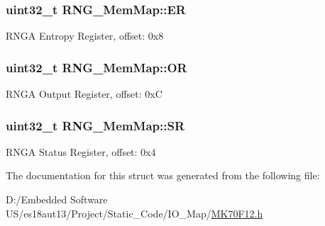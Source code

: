 \subsubsection[{E\+R}]{\setlength{\rightskip}{0pt plus 5cm}uint32\+\_\+t R\+N\+G\+\_\+\+Mem\+Map\+::\+E\+R}\label{struct_r_n_g___mem_map_a00c023d8dafb81ac55c86b3ad8decb3d}
R\+N\+G\+A Entropy Register, offset\+: 0x8 \hypertarget{struct_r_n_g___mem_map_a28a39f4167d28546cea918687d2951f1}{}
\subsubsection[{O\+R}]{\setlength{\rightskip}{0pt plus 5cm}uint32\+\_\+t R\+N\+G\+\_\+\+Mem\+Map\+::\+O\+R}\label{struct_r_n_g___mem_map_a28a39f4167d28546cea918687d2951f1}
R\+N\+G\+A Output Register, offset\+: 0x\+C \hypertarget{struct_r_n_g___mem_map_a5d258b2ed1915070a6d3651092d8f3c7}{}
\subsubsection[{S\+R}]{\setlength{\rightskip}{0pt plus 5cm}uint32\+\_\+t R\+N\+G\+\_\+\+Mem\+Map\+::\+S\+R}\label{struct_r_n_g___mem_map_a5d258b2ed1915070a6d3651092d8f3c7}
R\+N\+G\+A Status Register, offset\+: 0x4 

The documentation for this struct was generated from the following file\+:\begin{DoxyCompactItemize}
\item 
D\+:/\+Embedded Software U\+S/es18aut13/\+Project/\+Static\+\_\+\+Code/\+I\+O\+\_\+\+Map/\hyperlink{_m_k70_f12_8h}{M\+K70\+F12.\+h}\end{DoxyCompactItemize}
